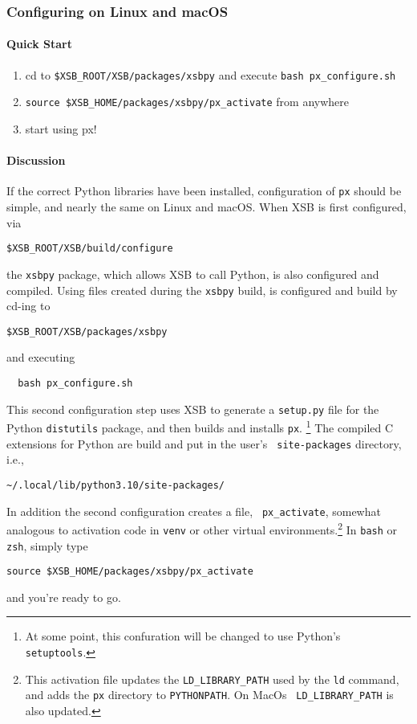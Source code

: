 \subsubsection{Configuring \px{} on Linux and macOS}

\paragraph{Quick Start}
\begin{enumerate}
\item cd to {\tt \$XSB\_ROOT/XSB/packages/xsbpy} and execute  {\tt bash px\_configure.sh}
\item {\tt source \$XSB\_HOME/packages/xsbpy/px\_activate} from anywhere
\item start using px!
\end{enumerate}

\paragraph{Discussion}
If the correct Python libraries have been installed, configuration of
{\tt px} should be simple, and nearly the same on Linux and
macOS.  When XSB is first configured, via
\begin{verbatim}
$XSB_ROOT/XSB/build/configure
\end{verbatim}
the {\tt xsbpy} package, which allows XSB to call Python, is also
configured and compiled.  Using files created during the {\tt xsbpy}
build, \px{} is configured and build by cd-ing to
\begin{verbatim}
$XSB_ROOT/XSB/packages/xsbpy
\end{verbatim}
\noindent
and executing
\begin{verbatim}
  bash px_configure.sh
\end{verbatim}
This second configuration step uses XSB to generate a {\tt setup.py}
file for the Python {\tt distutils} package, and then builds and
installs {\tt px}.  \footnote{At some point, this confuration will be
  changed to use Python's {\tt setuptools}.}  The compiled C
extensions for Python are build and put in the user's {\tt
  site-packages} directory, i.e.,
\begin{verbatim}
~/.local/lib/python3.10/site-packages/
\end{verbatim}
In addition the second configuration creates a file, {\tt
  px\_activate}, somewhat analogous to activation code in {\tt venv}
or other virtual environments.\footnote{This activation file updates
  the {\tt LD\_LIBRARY\_PATH} used by the {\tt ld} command, and adds
  the {\tt px} directory to {\tt PYTHONPATH}.  On MacOs {\tt
    LD\_LIBRARY\_PATH} is also updated.} In {\tt bash} or {\tt zsh},
simply type
\begin{verbatim}
source $XSB_HOME/packages/xsbpy/px_activate
\end{verbatim}
and you're ready to go.

